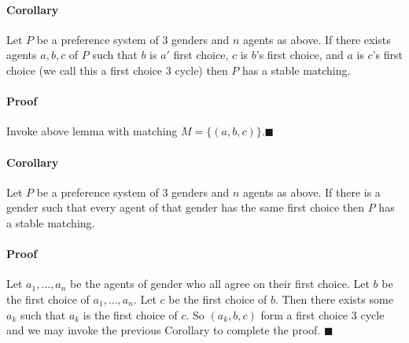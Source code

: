\documentclass[letterpaper,12pt,oneside,onecolumn]{article}
\begin{document}
\paragraph{Corollary}
Let $P$ be a preference system of $3$ genders and $n$ agents as above. If there exists agents $a,b,c$ of $P$ such that $b$ is $a'$ first choice, $c$ is $b$'s first choice, and $a$ is $c$'s first choice (we call this a first choice $3$ cycle) then $P$ has a stable matching.
\paragraph{Proof}
Invoke above lemma with matching $M = \{ (a,b,c)\}$.$\blacksquare$
\paragraph{Corollary}
Let $P$ be a preference system of $3$ genders and $n$ agents as above. If there is a gender such that every agent of that gender has the same first choice then $P$ has a stable matching.
\paragraph{Proof}
Let $a_1, \dots, a_n$ be the agents of gender who all agree on their first choice. Let $b$ be the first choice of $a_1, \dots, a_n$. Let $c$ be the first choice of $b$. Then there exists some $a_k$ such that $a_k$ is the first choice of $c$. So $(a_k, b,c)$ form a first choice $3$ cycle and we may invoke the previous Corollary to complete the proof. $\blacksquare$
\end{document}
